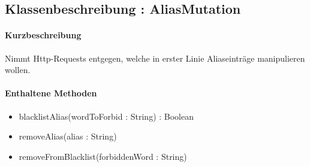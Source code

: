 \subsection{Klassenbeschreibung : AliasMutation}%
\paragraph*{Kurzbeschreibung}
Nimmt Http-Requests entgegen, welche in erster Linie Aliaseinträge manipulieren wollen.
\paragraph*{Enthaltene Methoden}
\begin{itemize}
    \item blacklistAlias(wordToForbid : String) : Boolean
    \item removeAlias(alias : String)
    \item removeFromBlacklist(forbiddenWord : String)
\end{itemize}